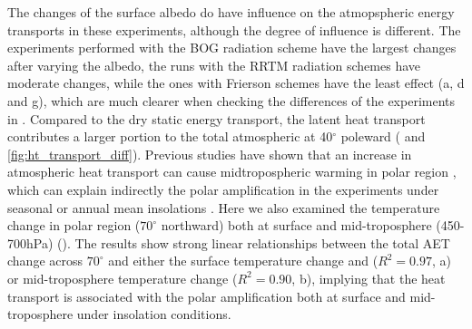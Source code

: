 
The changes of the surface albedo do have influence on the atmopspheric energy transports in these experiments, although the degree of influence is different. The experiments performed with the BOG radiation scheme have the largest changes after varying the albedo, the runs with the RRTM radiation schemes have moderate changes, while the ones with Frierson schemes have the least effect (a, d and g), which are much clearer when checking the differences of the experiments in . Compared to the dry static energy transport, the latent heat transport contributes a larger portion to the total atmospheric at 40$^\circ$ poleward ( and \ref{fig:ht_transport_diff}). Previous studies have shown that an increase in atmospheric heat transport can cause midtropospheric warming in polar region \citep[e.g.,][]{Screen2012}, which can explain indirectly the polar amplification in the experiments under seasonal or annual mean insolations \citep{Kim2018}.  Here we also examined the temperature change in polar region ($70^\circ$ northward) both at surface and mid-troposphere (450-700hPa) (). The results show strong linear relationships between the total AET change across $70^\circ$ and either the surface temperature change and ($R^2=0.97$, a) or mid-troposphere temperature change ($R^2=0.90$, b), implying that the heat transport is associated with the polar amplification both at surface and mid-troposphere under insolation conditions.



